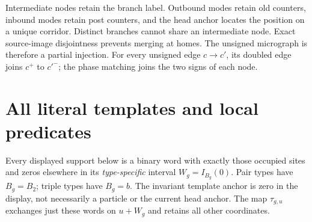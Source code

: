 \documentclass[11pt,a4paper]{article}
\numberwithin{equation}{section}
\begin{document}
Intermediate nodes retain the branch label. Outbound modes retain old counters, inbound modes retain post counters, and the head anchor locates the position on a unique corridor. Distinct branches cannot share an intermediate node. Exact source-image disjointness prevents merging at homes. The unsigned micrograph is therefore a partial injection. For every unsigned edge $c\to c'$, its doubled edge joins $c^+$ to $c'^-$; the phase matching joins the two signs of each node.

\section{All literal templates and local predicates}\label{fpa:tr:sec:templates}
Every displayed support below is a binary word with exactly those occupied sites and zeros elsewhere in its \emph{type-specific} interval $W_g=I_{B_g}(0)$. Pair types have $B_g=B_2$; triple types have $B_g=b$. The invariant template anchor is zero in the display, not necessarily a particle or the current head anchor. The map $\tau_{g,u}$ exchanges just these words on $u+W_g$ and retains all other coordinates.
\end{document}
